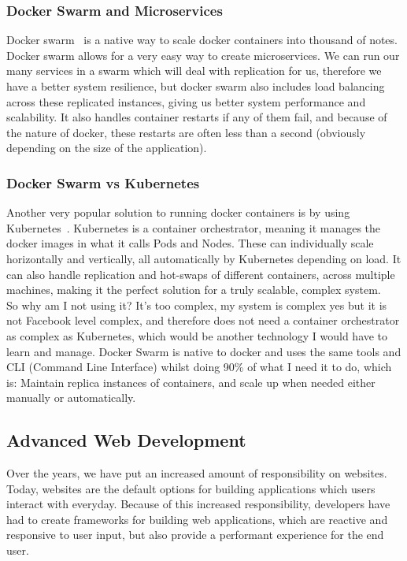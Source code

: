 \documentclass[titlepage]{article}
\begin{document}
\subsubsection{Docker Swarm and Microservices}
Docker swarm~\cite{docker_swarm} is a native way to scale docker containers into thousand of notes. Docker swarm allows for a very easy way to create microservices. We can run our many services in a swarm which will deal with replication for us, therefore we have a better system resilience, but docker swarm also includes load balancing across these replicated instances, giving us better system performance and scalability. It also handles container restarts if any of them fail, and because of the nature of docker, these restarts are often less than a second (obviously depending on the size of the application).

\subsubsection{Docker Swarm vs Kubernetes}
Another very popular solution to running docker containers is by using Kubernetes~\cite{kubernetes}. Kubernetes is a container orchestrator, meaning it manages the docker images in what it calls Pods and Nodes. These can individually scale horizontally and vertically, all automatically by Kubernetes depending on load. It can also handle replication and hot-swaps of different containers, across multiple machines, making it the perfect solution for a truly scalable, complex system. \\

So why am I not using it? It's too complex, my system is complex yes but it is not Facebook level complex, and therefore does not need a container orchestrator as complex as Kubernetes, which would be another technology I would have to learn and manage. Docker Swarm is native to docker and uses the same tools and CLI (Command Line Interface) whilst doing 90\% of what I need it to do, which is: Maintain replica instances of containers, and scale up when needed either manually or automatically. \\

\subsection{Advanced Web Development}
Over the years, we have put an increased amount of responsibility on websites. Today, websites are the default options for building applications which users interact with everyday. Because of this increased responsibility, developers have had to create frameworks for building web applications, which are reactive and responsive to user input, but also provide a performant experience for the end user.
\end{document}
